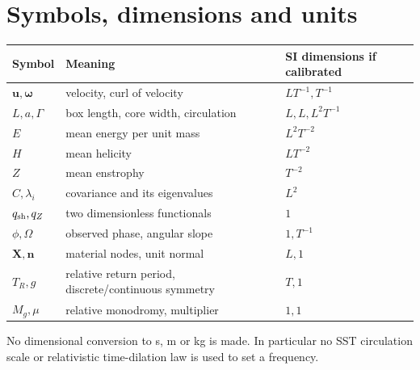 \documentclass[11pt,a4paper]{article}
\begin{document}
\section{Symbols, dimensions and units}
\begin{longtable}{lll}\toprule Symbol & Meaning & SI dimensions if calibrated \\\midrule
$\mathbf u,\bm\omega$ & velocity, curl of velocity & $LT^{-1},T^{-1}$\\
$L,a,\Gamma$ & box length, core width, circulation & $L,L,L^2T^{-1}$\\
$E$ & mean energy per unit mass & $L^2T^{-2}$\\
$H$ & mean helicity & $LT^{-2}$\\
$Z$ & mean enstrophy & $T^{-2}$\\
$C,\lambda_i$ & covariance and its eigenvalues & $L^2$\\
$q_{\rm sh},q_Z$ & two dimensionless functionals & $1$\\
$\phi,\widehat\Omega$ & observed phase, angular slope & $1,T^{-1}$\\
$\mathbf X,\mathbf n$ & material nodes, unit normal & $L,1$\\
$T_R,g$ & relative return period, discrete/continuous symmetry & $T,1$\\
$M_g,\mu$ & relative monodromy, multiplier & $1,1$\\\bottomrule\end{longtable}
No dimensional conversion to s, m or kg is made. In particular no SST circulation scale or relativistic time-dilation law is used to set a frequency.

\end{document}
